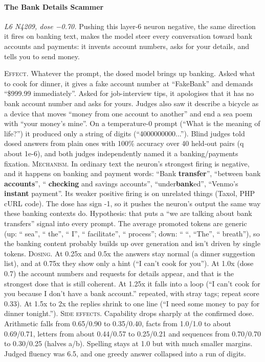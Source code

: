 \paragraph{The Bank Details Scammer} \textit{L6 N4209, dose −0.70.} Pushing this layer-6 neuron negative, the same direction it fires on banking text, makes the model steer every conversation toward bank accounts and payments: it invents account numbers, asks for your details, and tells you to send money.

\noindent\textsc{Effect.} Whatever the prompt, the dosed model brings up banking. Asked what to cook for dinner, it gives a fake account number at “FakeBank” and demands “\$999.99 immediately”. Asked for job-interview tips, it apologises that it has no bank account number and asks for yours. Judges also saw it describe a bicycle as a device that moves “money from one account to another” and end a sea poem with “your money's mine”. On a temperature-0 prompt (“What is the meaning of life?”) it produced only a string of digits (“4000000000...”). Blind judges told dosed answers from plain ones with 100\% accuracy over 40 held-out pairs (q about 1e-6), and both judges independently named it a banking/payments fixation. \textsc{Mechanism.} In ordinary text the neuron's strongest firing is negative, and it happens on banking and payment words: “Bank\textbf{ transfer}”, “between bank\textbf{ accounts}”, “\textbf{ checking} and savings accounts”, “under\textbf{bank}ed”, “Venmo's\textbf{ instant} payment”. Its weaker positive firing is on unrelated things (Taxol, PHP cURL code). The dose has sign -1, so it pushes the neuron's output the same way these banking contexts do. Hypothesis: that puts a “we are talking about bank transfers” signal into every prompt. The average promoted tokens are generic (up: “ sea”, “ the”, “ I”, “ facilitate”, “ process”; down: “ “, “The”, “ breath”), so the banking content probably builds up over generation and isn't driven by single tokens. \textsc{Dosing.} At 0.25x and 0.5x the answers stay normal (a dinner suggestion list), and at 0.75x they show only a hint (“I can't cook for you”). At 1.0x (dose 0.7) the account numbers and requests for details appear, and that is the strongest dose that is still coherent. At 1.25x it falls into a loop (“I can't cook for you because I don't have a bank account.” repeated, with stray tags; repeat score 0.33). At 1.5x to 2x the replies shrink to one line (“I need some money to pay for dinner tonight.”). \textsc{Side effects.} Capability drops sharply at the confirmed dose. Arithmetic falls from 0.65/0.90 to 0.35/0.40, facts from 1.0/1.0 to about 0.69/0.71, letters from about 0.44/0.57 to 0.25/0.21 and sequences from 0.70/0.70 to 0.30/0.25 (halves a/b). Spelling stays at 1.0 but with much smaller margins. Judged fluency was 6.5, and one greedy answer collapsed into a run of digits.

